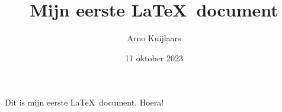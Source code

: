 \documentclass[12pt,a4paper]{article}
\title{Mijn eerste \LaTeX\ document}
\author{Arno Kuijlaars}
\date{11 oktober 2023}
\begin{document}
\maketitle
    Dit is mijn eerste \LaTeX\ document.  Hoera! 
\end{document}
